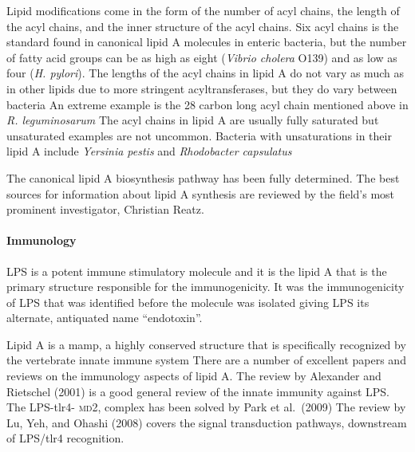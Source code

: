 Lipid modifications come in the form of the number of acyl chains, the length of the acyl chains, and the inner structure of the acyl chains. Six acyl chains is the standard found in canonical lipid A molecules in enteric bacteria, but the number of fatty acid groups can be as high as eight (\eg \textit{Vibrio cholera} O139) and as low as four (\eg \textit{H. pylori}). The lengths of the acyl chains in lipid A do not vary as much as in other lipids due to more stringent acyltransferases, but they do vary between bacteria An extreme example is the 28 carbon long acyl chain mentioned above in \textit{R. leguminosarum} The acyl chains in lipid A are usually fully saturated but unsaturated examples are not uncommon. Bacteria with unsaturations in their lipid A include \caulobacter{} \textit{Yersinia pestis} and \textit{Rhodobacter capsulatus}

The canonical lipid A biosynthesis pathway has been fully determined. The best
sources for information about lipid A synthesis are reviewed by the field's most prominent investigator, Christian Reatz. 

    \paragraph{Immunology}

\ac{LPS} is a potent immune stimulatory molecule and it is the lipid A that is
the primary structure responsible for the immunogenicity. It was the immunogenicity of \ac{LPS} that was identified before the molecule was isolated giving \ac{LPS} its alternate, antiquated name ``endotoxin''. 

Lipid A is a \ac{mamp}, a highly conserved structure that is specifically recognized by the vertebrate innate immune system
There are a number of excellent papers and reviews on the immunology aspects of lipid A. The review by Alexander and Rietschel (2001) is a good general review of the innate immunity against \ac{LPS}. The \ac{LPS}-\ac{tlr4}- \textsc{md}2, complex has been solved by Park et al.~(2009) The review by Lu, Yeh, and Ohashi (2008) covers the signal transduction pathways, downstream of \ac{LPS}/\ac{tlr4} recognition. 

